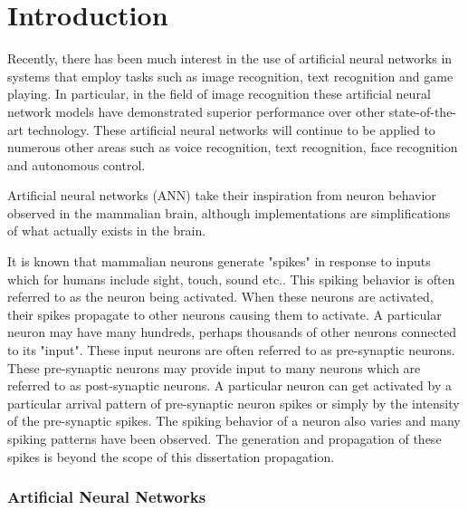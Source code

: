 
\chapter{Introduction}
\label{sec:chap-one}

Recently, there has been much interest in the use of artificial neural networks in systems that employ tasks such as image recognition\cite{krizhevsky2012imagenet}, text recognition\cite{qiu2013parallel} and game playing\cite{maddison2014move}.
In particular, in the field of image recognition these artificial neural network models have demonstrated superior performance
over other state-of-the-art technology\cite{krizhevsky2012imagenet}.
These artificial neural networks will continue to be applied to numerous other areas such as voice recognition, text recognition, 
face recognition and autonomous control.

Artificial neural networks (ANN) take their inspiration from neuron behavior observed in the mammalian brain, although
implementations are simplifications of what actually exists in the brain.

\iftrue
It is known that mammalian neurons generate "spikes" in response to inputs which for humans include sight, touch, sound etc.. This spiking behavior is often referred to as the neuron being activated.
When these neurons are activated, their spikes propagate to other neurons causing them to activate. A particular neuron may have many hundreds, perhaps thousands of other neurons connected to its "input".
These input neurons are often referred to as pre-synaptic neurons. These pre-synaptic neurons may provide input to many neurons which are referred to as post-synaptic neurons.
A particular neuron can get activated by a particular arrival pattern of pre-synaptic neuron spikes or simply by the intensity of the pre-synaptic spikes. The spiking behavior of a neuron also varies and many
spiking patterns have been observed. The generation and propagation of these spikes is beyond the scope of this dissertation propagation.


\subsection*{Artificial Neural Networks}
\label{sec:Artificial Neural Networks}

